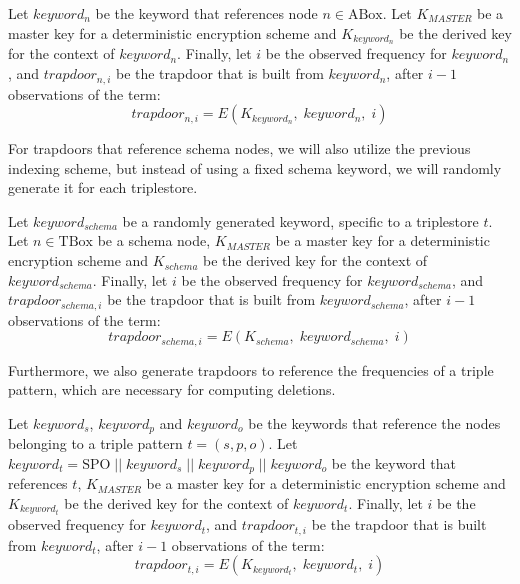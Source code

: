 \begin{definition}\label{ch3:definition:trapdoor-generation}
    Let $keyword_n$ be the keyword that references node $n \in \textrm{ABox}$. Let $K_{MASTER}$ be a master key for a deterministic encryption scheme and $K_{keyword_n}$ be the derived key for the context of $keyword_n$. Finally, let $i$ be the observed frequency for $keyword_n$, and $trapdoor_{n,i}$ be the trapdoor that is built from $keyword_n$, after $i - 1$ observations of the term:
    \begin{equation}
        trapdoor_{n, i} = E(K_{keyword_n}, \; keyword_n, \; i)
    \end{equation}
\end{definition}

For trapdoors that reference schema nodes, we will also utilize the previous indexing scheme, but instead of using a fixed schema keyword, we will randomly generate it for each triplestore.

\begin{definition}\label{ch3:definition:schema-trapdoor-generation}
    Let $keyword_{schema}$ be a randomly generated keyword, specific to a triplestore $t$. Let $n \in \textrm{TBox}$ be a schema node, $K_{MASTER}$ be a master key for a deterministic encryption scheme and $K_{schema}$ be the derived key for the context of $keyword_{schema}$. Finally, let $i$ be the observed frequency for $keyword_{schema}$, and $trapdoor_{schema,i}$ be the trapdoor that is built from $keyword_{schema}$, after $i - 1$ observations of the term:
    \begin{equation}
        trapdoor_{schema,i} = E(K_{schema}, \; keyword_{schema}, \; i)
    \end{equation}
\end{definition}

Furthermore, we also generate trapdoors to reference the frequencies of a triple pattern, which are necessary for computing deletions.

\begin{definition}\label{ch3:definition:schema-triple-freq-generation}
    Let $keyword_{s}$, $keyword_{p}$ and $keyword_{o}$ be the keywords that reference the nodes belonging to a triple pattern $t = (s, p, o)$. Let $keyword_{t} = \textrm{SPO} \; \vert\vert \; keyword_{s} \; \vert\vert \; keyword_{p} \; \vert\vert \; keyword_{o}$ be the keyword that references $t$, $K_{MASTER}$ be a master key for a deterministic encryption scheme and $K_{keyword_{t}}$ be the derived key for the context of $keyword_{t}$. Finally, let $i$ be the observed frequency for $keyword_{t}$, and $trapdoor_{t,i}$ be the trapdoor that is built from $keyword_{t}$, after $i - 1$ observations of the term:
    \begin{equation}
        trapdoor_{t,i} = E(K_{keyword_{t}}, \; keyword_{t}, \; i)
    \end{equation}
\end{definition}


